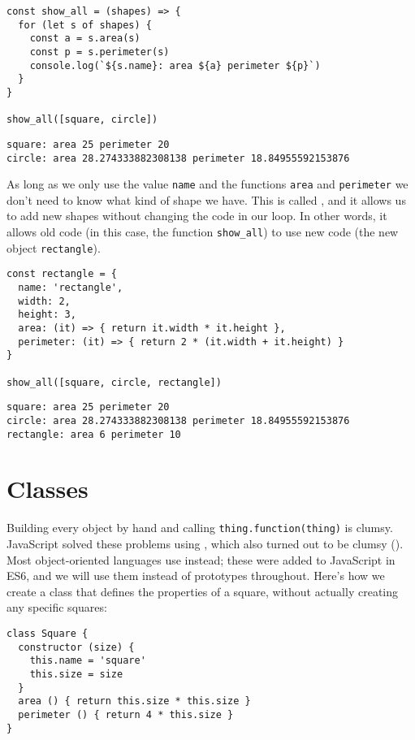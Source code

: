 \begin{verbatim}
const show_all = (shapes) => {
  for (let s of shapes) {
    const a = s.area(s)
    const p = s.perimeter(s)
    console.log(`${s.name}: area ${a} perimeter ${p}`)
  }
}

show_all([square, circle])
\end{verbatim}

\begin{verbatim}
square: area 25 perimeter 20
circle: area 28.274333882308138 perimeter 18.84955592153876
\end{verbatim}

As long as we only use the value \texttt{name} and the functions \texttt{area} and \texttt{perimeter}
we don't need to know what kind of shape we have.
This is called ,
and it allows us to add new shapes without changing the code in our loop.
In other words,
it allows old code (in this case, the function \texttt{show\_all})
to use new code (the new object \texttt{rectangle}).

\begin{verbatim}
const rectangle = {
  name: 'rectangle',
  width: 2,
  height: 3,
  area: (it) => { return it.width * it.height },
  perimeter: (it) => { return 2 * (it.width + it.height) }
}

show_all([square, circle, rectangle])
\end{verbatim}

\begin{verbatim}
square: area 25 perimeter 20
circle: area 28.274333882308138 perimeter 18.84955592153876
rectangle: area 6 perimeter 10
\end{verbatim}

\section{Classes}\label{s:oop-classes}

Building every object by hand and calling \texttt{thing.function(thing)} is clumsy.
JavaScript solved these problems using ,
which also turned out to be clumsy ().
Most object-oriented languages use  instead;
these were added to JavaScript in ES6,
and we will use them instead of prototypes throughout.
Here's how we create a class that defines the properties of a square,
without actually creating any specific squares:

\begin{verbatim}
class Square {
  constructor (size) {
    this.name = 'square'
    this.size = size
  }
  area () { return this.size * this.size }
  perimeter () { return 4 * this.size }
}
\end{verbatim}

